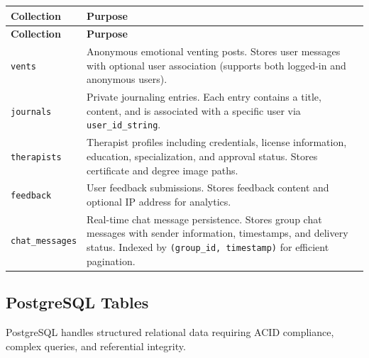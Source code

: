 \documentclass[11pt,a4paper]{article}
\begin{document}
\begin{longtable}{|p{4cm}|p{10cm}|}
\hline
\rowcolor{mongogreen!20}
\textbf{Collection} & \textbf{Purpose} \\
\hline
\endfirsthead

\hline
\rowcolor{mongogreen!20}
\textbf{Collection} & \textbf{Purpose} \\
\hline
\endhead

\texttt{vents} & Anonymous emotional venting posts. Stores user messages with optional user association (supports both logged-in and anonymous users). \\
\hline

\texttt{journals} & Private journaling entries. Each entry contains a title, content, and is associated with a specific user via \texttt{user\_id\_string}. \\
\hline

\texttt{therapists} & Therapist profiles including credentials, license information, education, specialization, and approval status. Stores certificate and degree image paths. \\
\hline

\texttt{feedback} & User feedback submissions. Stores feedback content and optional IP address for analytics. \\
\hline

\texttt{chat\_messages} & Real-time chat message persistence. Stores group chat messages with sender information, timestamps, and delivery status. Indexed by \texttt{(group\_id, timestamp)} for efficient pagination. \\
\hline

\end{longtable}

\subsection{\textcolor{postgresblue}{PostgreSQL Tables}}

PostgreSQL handles structured relational data requiring ACID compliance, complex queries, and referential integrity.
\end{document}

